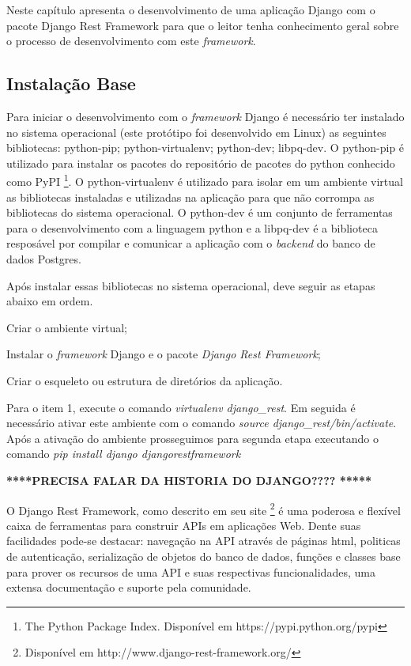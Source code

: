   Neste capítulo apresenta o desenvolvimento de uma aplicação Django com o pacote Django Rest Framework para que o 
  leitor tenha conhecimento geral sobre o processo de desenvolvimento com este \textit{framework}. 
  
  
\subsection{Instalação Base}

  Para iniciar o desenvolvimento com o \textit{framework} Django é necessário ter instalado no sistema operacional
  (este protótipo foi desenvolvido em Linux) as seguintes bibliotecas: python-pip; python-virtualenv; python-dev;
  libpq-dev.  O python-pip é utilizado para instalar os pacotes do repositório de pacotes do python conhecido como
  PyPI \footnote{The Python Package Index. Disponível em https://pypi.python.org/pypi}. O python-virtualenv é utilizado
  para isolar em um ambiente virtual as bibliotecas instaladas e utilizadas na aplicação para que não corrompa as bibliotecas
  do sistema operacional. O python-dev é um conjunto de ferramentas para o desenvolvimento com a linguagem python e a libpq-dev
  é a biblioteca resposável por compilar e comunicar a aplicação com o \textit{backend} do banco de dados Postgres.
  
  Após instalar essas bibliotecas no sistema operacional, deve seguir as etapas abaixo em ordem.
  
  \begin{compactitem}
    \item[1)] Criar o ambiente virtual;
    \item[2)] Instalar o \textit{framework} Django e o pacote \textit{Django Rest Framework};
    \item[3)] Criar o esqueleto ou estrutura de diretórios da aplicação.
  \end{compactitem}
  
  Para o item 1, execute o comando \textit{virtualenv django_rest}. Em seguida é necessário ativar este ambiente com o comando
  \textit{source django_rest/bin/activate}. Após a ativação do ambiente prosseguimos para segunda etapa executando o comando
  \textit{ pip install django djangorestframework}
  
  \textbf{****PRECISA FALAR DA HISTORIA DO DJANGO???? *****}
  
  O Django Rest Framework, como descrito em seu site \footnote{Disponível em http://www.django-rest-framework.org/} é uma poderosa
  e flexível caixa de ferramentas para construir APIs em aplicações Web. Dente suas facilidades pode-se destacar: navegação na API através
  de páginas html, politicas de autenticação, serialização de objetos do banco de dados, funções e classes base para prover os recursos
  de uma API e suas respectivas funcionalidades, uma extensa documentação e suporte pela comunidade.
  

